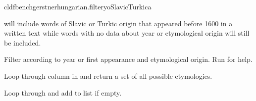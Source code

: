\documentclass[letterpaper,10pt,english]{sphinxmanual}
\begin{document}
\begin{sphinxVerbatim}[commandchars=\\\{\}]
cldfbenchgerstnerhungarian.filter\PYGZhy{}y\PYGZhy{}oSlavicTurkic\PYGZhy{}a
\end{sphinxVerbatim}

\sphinxAtStartPar
will include words of Slavic or Turkic origin that appeared before 1600 in a
written text while words with no data about year or etymological origin
will still be included.

\label{\detokenize{filter:module-gerstnerhungariancommands.filter}}
\sphinxAtStartPar
Filter  according to year or first appearance and
etymological origin. Run 
for help.

\begin{fulllineitems}
\label{\detokenize{filter:gerstnerhungariancommands.filter.add_all_etymologies}}
\pysigstartsignatures
{}
\pysigstopsignatures
\sphinxAtStartPar
Loop through column  in  and return a set
of all possible etymologies.

\end{fulllineitems}


\begin{fulllineitems}
\label{\detokenize{filter:gerstnerhungariancommands.filter.find_empty}}
\pysigstartsignatures
{}
\pysigstopsignatures
\sphinxAtStartPar
Loop through  and add  to list if 
empty.

\end{fulllineitems}
\end{document}
